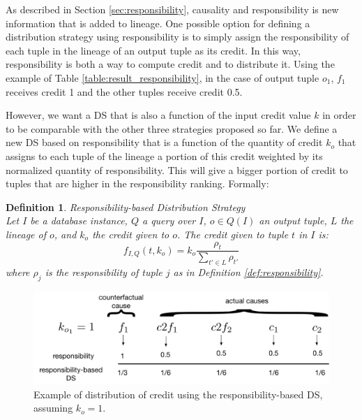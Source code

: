 \documentclass[preprint,12pt,sort&compress]{elsarticle}
\newtheorem{definition}{Definition}[section]
\begin{document}

As described in Section \ref{sec:responsibility}, causality and responsibility is 
new information that is added to lineage.   One possible option for defining a distribution strategy using responsibility is to simply assign the responsibility of each tuple in the lineage of an output tuple as its credit. In this way, responsibility is both a way to compute credit and to distribute it.
Using the example of Table \ref{table:result_responsibility}, in the case of output tuple $o_1$, $f_1$ receives credit 1 and the other tuples receive credit 0.5.


However, we want a DS that is also a function of the input credit value $k$ in order to be comparable with the other three strategies proposed so far.
We define a new DS based on responsibility that is a function of the quantity of credit $k_o$ that assigns to each tuple of the lineage a portion of this credit weighted by its normalized quantity of responsibility.
This will give a bigger portion of credit to tuples that are higher in the responsibility ranking.
Formally:
\newline
\begin{definition}{Responsibility-based Distribution Strategy}\\
\label{def:resp_ds}
Let $I$ be a database instance, $Q$ a query over $I$, $o \in Q(I)$ an output tuple, $L$ the lineage of $o$, and $k_o$ the credit given to $o$. The credit given to tuple $t$ in $I$ is:
\[
	f_{I, Q}(t, k_o) = k_o \frac{\rho_t}{\sum_{t' \in L} \rho_{t'}}
\]
where $\rho_j$ is the responsibility of tuple $j$ as in Definition \ref{def:responsibility}.
\end{definition}


\begin{figure}[]
\centering
  \includegraphics[width=.7\textwidth]{resp_example}
  \caption{Example of distribution of credit using 
    the responsibility-based DS, assuming $k_o = 1$.}
  \label{fig:resp_example}
\end{figure}
\end{document}

